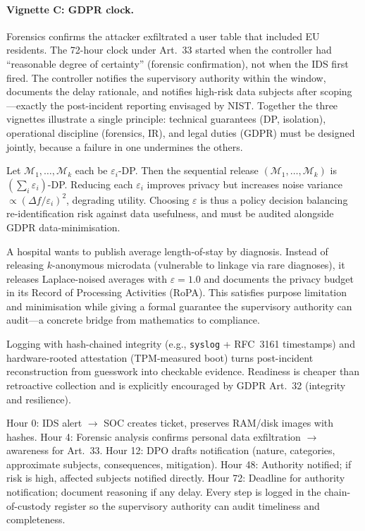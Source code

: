 \paragraph{Vignette C: GDPR clock.} Forensics confirms the attacker exfiltrated a user table that included EU residents. The 72-hour clock under Art.~33 started when the controller had ``reasonable degree of certainty'' (forensic confirmation), not when the IDS first fired. The controller notifies the supervisory authority within the window, documents the delay rationale, and notifies high-risk data subjects after scoping---exactly the post-incident reporting envisaged by NIST.
Together the three vignettes illustrate a single principle: technical guarantees (DP, isolation), operational discipline (forensics, IR), and legal duties (GDPR) must be designed jointly, because a failure in one undermines the others.
\begin{theorem}
Let $\mathcal{M}_1,\dots,\mathcal{M}_k$ each be $\varepsilon_i$-DP. Then the sequential release $(\mathcal{M}_1,\dots,\mathcal{M}_k)$ is $(\sum_i\varepsilon_i)$-DP. Reducing each $\varepsilon_i$ improves privacy but increases noise variance $\propto(\Delta f/\varepsilon_i)^2$, degrading utility. Choosing $\varepsilon$ is thus a policy decision balancing re-identification risk against data usefulness, and must be audited alongside GDPR data-minimisation.
\end{theorem}
\begin{example}
A hospital wants to publish average length-of-stay by diagnosis. Instead of releasing $k$-anonymous microdata (vulnerable to linkage via rare diagnoses), it releases Laplace-noised averages with $\varepsilon=1.0$ and documents the privacy budget in its Record of Processing Activities (RoPA). This satisfies purpose limitation and minimisation while giving a formal guarantee the supervisory authority can audit---a concrete bridge from mathematics to compliance.
\end{example}
\begin{remark}
Logging with hash-chained integrity (e.g., \texttt{syslog} + RFC~3161 timestamps) and hardware-rooted attestation (TPM-measured boot) turns post-incident reconstruction from guesswork into checkable evidence. Readiness is cheaper than retroactive collection and is explicitly encouraged by GDPR Art.~32 (integrity and resilience).
\end{remark}
\begin{example}
Hour 0: IDS alert $\to$ SOC creates ticket, preserves RAM/disk images with hashes.
Hour 4: Forensic analysis confirms personal data exfiltration $\to$ awareness for Art.~33.
Hour 12: DPO drafts notification (nature, categories, approximate subjects, consequences, mitigation).
Hour 48: Authority notified; if risk is high, affected subjects notified directly.
Hour 72: Deadline for authority notification; document reasoning if any delay.
Every step is logged in the chain-of-custody register so the supervisory authority can audit timeliness and completeness.
\end{example}
